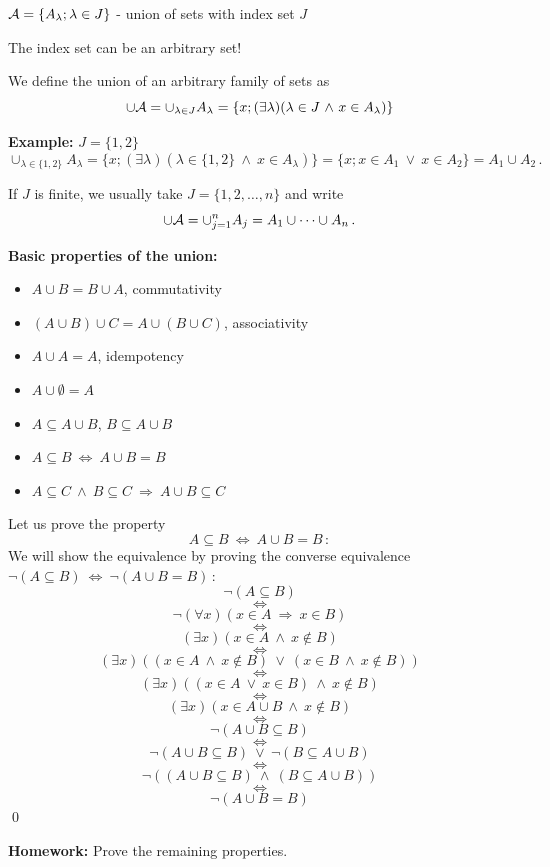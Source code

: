 \documentclass[11pt,paper=b5,footinclude,headinclude]{scrbook} %
\def\ali {{~\vee~}}
\def\inn {{~\wedge~}}
\def\sledi {{~\Rightarrow~}}
\def\cee {{~\Leftrightarrow~}}
\theoremstyle{remark}
\theoremstyle{definition} %
\theoremstyle{theorem} %
\begin{document}
${\cal A} = \{A_\lambda; \lambda \in J\}$ - union of sets with index set $J$

The index set can be an arbitrary set!

We define the union of an arbitrary family of sets as
$$\cup {\cal A} = \cup_{\lambda \in J} A_\lambda = \{x;(\exists \lambda) (\lambda \in J\inn x\in A_\lambda)\}$$

\medskip
\textbf{ Example:} $J = \{1,2\}$
$$\cup_{\lambda \in \{1,2\}} A_\lambda = \{x;(\exists \lambda) (\lambda \in \{1,2\}\inn x\in A_\lambda)\}= \{x;x\in A_1 \ali x\in A_2\} = A_1\cup A_2\,.$$

\medskip
If $J$ is finite, we usually take $J = \{1,2,\ldots, n\}$ and write
$$\cup {\cal A} = \cup_{j = 1}^nA_j = A_1\cup\cdots\cup A_n\,.$$

\bigskip
\textbf{ Basic properties of the union:}
\begin{itemize}
  \item $A\cup B = B\cup A$, commutativity
  \item $(A\cup B)\cup C = A\cup (B\cup C)$, associativity
  \item $A\cup A = A$, idempotency
  \item $A\cup \emptyset = A$
  \item $A\subseteq A\cup B$, $B\subseteq A\cup B$
  \item $A\subseteq B\cee A\cup B = B$
  \item $A\subseteq C\inn B\subseteq C\sledi A\cup B \subseteq C$
\end{itemize}

\bigskip
Let us prove the property
$$A\subseteq B\cee A\cup B = B\,:$$
\medskip
We will show the equivalence by proving the converse equivalence
$\neg(A\subseteq B)\cee \neg(A\cup B = B)\,:$
$$\neg(A\subseteq B)$$
$$\cee$$
$$\neg(\forall x)(x\in A\sledi x\in B)$$
$$\cee$$
$$(\exists x)(x\in A \inn x\not\in B)$$
$$\cee$$
$$(\exists x)((x\in A \inn x\not\in B) \ali (x\in B \inn x\not\in B))$$
$$\cee$$
$$(\exists x)((x\in A \ali x\in B)\inn x\not\in B)$$
$$\cee$$
$$(\exists x)(x\in A\cup B\inn x\not\in B)$$
$$\cee$$
$$\neg(A\cup B \subseteq B)$$
$$\cee$$
$$\neg(A\cup B \subseteq B) \ali \neg(B \subseteq A\cup B) $$
$$\cee$$
$$\neg((A\cup B \subseteq B)\inn (B \subseteq A\cup B))$$
$$\cee$$
$$\neg(A\cup B = B)$$
\qed

\bigskip
\textbf{ Homework:} Prove the remaining properties.

\bigskip
\end{document}
